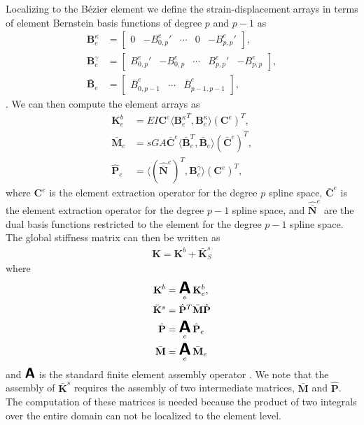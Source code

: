 \documentclass{article}
\DeclareMathOperator*{\A}{ \mathlarger{\mathlarger{\mathlarger{\boldsymbol{\mathsf{A}}}}} }
\begin{document}
Localizing to the B\'{e}zier element we define the strain-displacement arrays in terms of element Bernstein basis functions of degree $p$ and $p-1$ as
\begin{align}
	\mathbf{B}_e^\kappa 
    	&= \begin{bmatrix} 0 & -{B^e_{0,p}}' & \cdots & 0 & -{B^e_{p,p}}' \end{bmatrix}, \\
    \mathbf{B}_e^\gamma
    	&= \begin{bmatrix} {B^e_{0,p}}' & -B^e_{0,p} & \cdots & {B^e_{p,p}}' & -B^e_{p,p} \end{bmatrix}, \\
    \bar{\mathbf{B}}_e
    	&= \begin{bmatrix} \bar{B}^e_{0,p-1} & \cdots & \bar{B}^e_{p-1,p-1} \end{bmatrix},
\end{align}
. We can then compute the element arrays as
\begin{align}
\mathbf{K}_e^b &= EI\mathbf{C}^e\langle{{\mathbf{B}_e^\kappa}^T,\mathbf{B}_e^\kappa}\rangle(\mathbf{C}^e)^T, \label{eq:symmetric_timoshenko}\\
\bar{\mathbf{M}}_e &= s{GA}\bar{\mathbf{C}}^e\langle{\bar{\mathbf{B}}_e^T,\bar{\mathbf{B}}_e}\rangle(\bar{\mathbf{C}}^e)^T, \\
{\hat{\mathbf{P}}_e} &= \langle{(\hat{\bar{\mathbf{N}}}^e)^T,\mathbf{B}^\gamma_e}\rangle(\mathbf{C}^e)^T,
\end{align}
where $\mathbf{C}^e$ is the element extraction operator for the degree $p$ spline space, $\bar{\mathbf{C}}^e$ is the element extraction operator for the degree $p-1$ spline space, and $\hat{\bar{\mathbf{N}}}^e$ are the dual basis functions restricted to the element for the degree $p-1$ spline space. The global stiffness matrix can then be written as
\begin{align}
	\mathbf{K} = \mathbf{K}^b + \bar{\mathbf{K}}^s_S \label{eqn:symmetric_b_bar_timoshenko_stiffness}
\end{align}
where
\begin{align}
	\mathbf{K}^b &=\A_e\mathbf{K}_e^b,\label{eqn:bending_stiffness} \\
	\bar{\mathbf{K}}^s&={\hat{\mathbf{P}}}^T\bar{\mathbf{M}}{\hat{\mathbf{P}}}\label{eqn:shear_stiffness} \\
	{\hat{\mathbf{P}}} &=\A_e{\hat{\mathbf{P}}_e} \\
    \bar{\mathbf{M}} &=\A_e\bar{\mathbf{M}}_e
\end{align}
and $\A$ is the standard finite element assembly operator \cite{hughes_finite_2012}. We note that the assembly of $\bar{\mathbf{K}}^s$ requires the assembly of two intermediate matrices, $\bar{\mathbf{M}}$ and ${\hat{\mathbf{P}}}$. The computation of these matrices is needed because the product of two integrals over the entire domain can not be localized to the element level.
\end{document}
